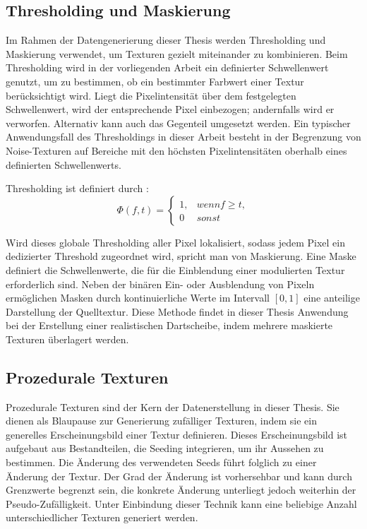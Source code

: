 \subsection{Thresholding und Maskierung}
\label{sec:thresholding_maskierung}

Im Rahmen der Datengenerierung dieser Thesis werden Thresholding und Maskierung verwendet, um Texturen gezielt miteinander zu kombinieren. Beim Thresholding wird in der vorliegenden Arbeit ein definierter Schwellenwert genutzt, um zu bestimmen, ob ein bestimmter Farbwert einer Textur berücksichtigt wird. Liegt die Pixelintensität über dem festgelegten Schwellenwert, wird der entsprechende Pixel einbezogen; andernfalls wird er verworfen. Alternativ kann auch das Gegenteil umgesetzt werden. Ein typischer Anwendungsfall des Thresholdings in dieser Arbeit besteht in der Begrenzung von Noise-Texturen auf Bereiche mit den höchsten Pixelintensitäten oberhalb eines definierten Schwellenwerts.

Thresholding ist definiert durch \cite{cv_general}:
\[\Phi(f, t) = \begin{cases}
    1, &wenn f \geq t,\\
    0 &sonst
\end{cases}\]

Wird dieses globale Thresholding aller Pixel lokalisiert, sodass jedem Pixel ein dedizierter Threshold zugeordnet wird, spricht man von Maskierung. Eine Maske definiert die Schwellenwerte, die für die Einblendung einer modulierten Textur erforderlich sind. Neben der binären Ein- oder Ausblendung von Pixeln ermöglichen Masken durch kontinuierliche Werte im Intervall $[0, 1]$ eine anteilige Darstellung der Quelltextur. Diese Methode findet in dieser Thesis Anwendung bei der Erstellung einer realistischen Dartscheibe, indem mehrere maskierte Texturen überlagert werden.


\subsection{Prozedurale Texturen}
\label{sec:was_prozedurale_texturen}

Prozedurale Texturen sind der Kern der Datenerstellung in dieser Thesis. Sie dienen als Blaupause zur Generierung zufälliger Texturen, indem sie ein generelles Erscheinungsbild einer Textur definieren. Dieses Erscheinungsbild ist aufgebaut aus Bestandteilen, die Seeding integrieren, um ihr Aussehen zu bestimmen. Die Änderung des verwendeten Seeds führt folglich zu einer Änderung der Textur. Der Grad der Änderung ist vorhersehbar und kann durch Grenzwerte begrenzt sein, die konkrete Änderung unterliegt jedoch weiterhin der Pseudo-Zufälligkeit. Unter Einbindung dieser Technik kann eine beliebige Anzahl unterschiedlicher Texturen generiert werden.
